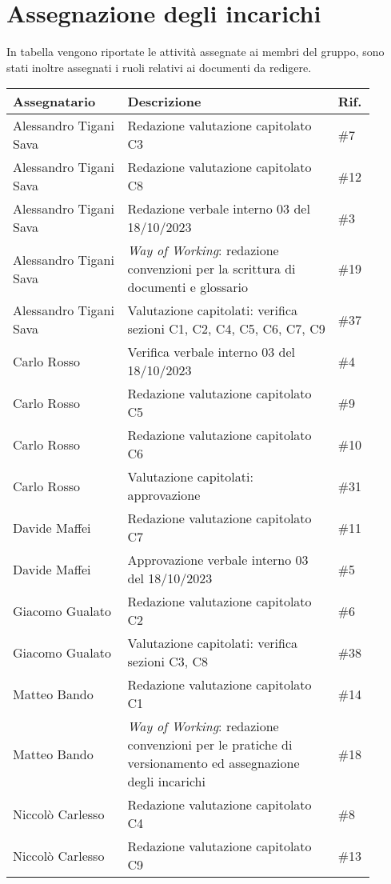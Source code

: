 \section{Assegnazione degli incarichi}
In tabella vengono riportate le attività assegnate ai membri del gruppo, sono stati inoltre assegnati i ruoli relativi ai documenti da redigere.

\begin{center}
    {
    \renewcommand{\arraystretch}{1.5}
    \begin{tabular}{p{0.30\linewidth}|p{0.55\linewidth}|p{0.05\linewidth}}
        \textbf{Assegnatario}    &   \textbf{Descrizione}   & \textbf{Rif.}     \\
        \hline
        Alessandro Tigani Sava  & Redazione valutazione capitolato C3   & \#7   \\
        \hline
        Alessandro Tigani Sava  & Redazione valutazione capitolato C8   & \#12  \\
        \hline
        Alessandro Tigani Sava  & Redazione verbale interno 03 del 18/10/2023   & \#3   \\
        \hline
        Alessandro Tigani Sava  & \textit{Way of Working}: redazione convenzioni per la scrittura di documenti e glossario & \#19 \\
        \hline
        Alessandro Tigani Sava  & Valutazione capitolati: verifica sezioni C1, C2, C4, C5, C6, C7, C9 & \#37  \\
        \hline 
        Carlo Rosso             & Verifica verbale interno 03 del 18/10/2023    & \#4   \\
        \hline
        Carlo Rosso             & Redazione valutazione capitolato C5 & \#9   \\
        \hline
        Carlo Rosso             & Redazione valutazione capitolato C6 & \#10  \\
        \hline
        Carlo Rosso             & Valutazione capitolati: approvazione  & \#31  \\
        \hline
        Davide Maffei           & Redazione valutazione capitolato C7 & \#11  \\
        \hline
        Davide Maffei           & Approvazione verbale interno 03 del 18/10/2023 & \#5   \\
        \hline
        Giacomo Gualato         & Redazione valutazione capitolato C2 & \#6   \\
        \hline 
        Giacomo Gualato         & Valutazione capitolati: verifica sezioni C3, C8 & \#38  \\
        \hline
        Matteo Bando            & Redazione valutazione capitolato C1 & \#14  \\
        \hline
        Matteo Bando            & \textit{Way of Working}: redazione convenzioni per le pratiche di versionamento ed assegnazione degli incarichi & \#18 \\
        \hline
        Niccolò Carlesso        & Redazione valutazione capitolato C4 & \#8   \\
        \hline
        Niccolò Carlesso        & Redazione valutazione capitolato C9 & \#13  \\
    \end{tabular}
    }
    \end{center}